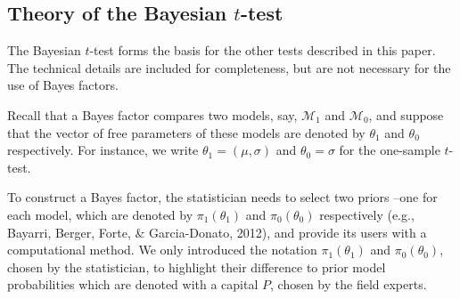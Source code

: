 \documentclass[english,,doc,floatsintext]{apa6}
\begin{document}
\hypertarget{theory-of-the-bayesian-t-test}{%
\subsection{\texorpdfstring{Theory of the Bayesian \(t\)-test}{Theory of the Bayesian t-test}}\label{theory-of-the-bayesian-t-test}}

The Bayesian \(t\)-test forms the basis for the other tests described in this paper. The technical details are included for completeness, but are not necessary for the use of Bayes factors.

Recall that a Bayes factor compares two models, say, \(\mathcal{M}_{1}\) and \(\mathcal{M}_{0}\), and suppose that the vector of free parameters of these models are denoted by \(\theta_{1}\) and \(\theta_{0}\) respectively. For instance, we write \(\theta_{1} = ( \mu, \sigma)\) and \(\theta_{0} = \sigma\) for the one-sample \(t\)-test.

To construct a Bayes factor, the statistician needs to select two priors --one for each model, which are denoted by \(\pi_{1} (\theta_{1})\) and \(\pi_{0} (\theta_{0})\) respectively (e.g., Bayarri, Berger, Forte, \& Garcia-Donato, 2012), and provide its users with a computational method. We only introduced the notation \(\pi_{1} (\theta_{1})\) and \(\pi_{0} (\theta_{0})\), chosen by the statistician, to highlight their difference to prior model probabilities which are denoted with a capital \(P\), chosen by the field experts.
\end{document}
